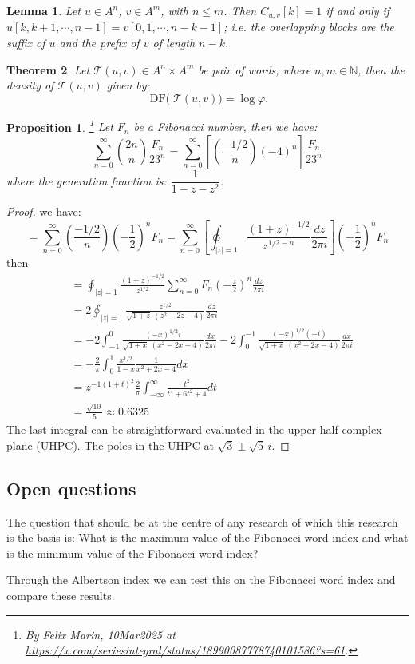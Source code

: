 \documentclass[12pt, a4paper]{article}
\newtheorem{theorem}{Theorem}[section]
\newtheorem{lemma}[theorem]{Lemma}
\newtheorem{proposition}{Proposition}[section]
\begin{document}
\begin{lemma}\cite{Rampersad2023Wiebe}
Let $u\in A^n$, $v\in A^m$, with $n\leq m$. Then $C_{u,v}[k]=1$ if and only if $u[k,k+1,\cdots,n-1] = v[0,1,\cdots,n-k-1]$; i.e. the overlapping blocks are the suffix of $u$ and the prefix of $v$ of length $n-k$.
\end{lemma}
\begin{theorem}
Let $\mathscr{T}(u,v)\in A^n\times A^m$ be pair of words, where $n,m\in \mathbb{N}$, then the density of $\mathscr{T}(u,v)$ given by: 
\[
\operatorname{DF(}\mathscr{T}(u,v))=\log \varphi.
\]
\end{theorem}


\begin{proposition}\footnote{By Felix Marin, 10Mar2025 at \url{https://x.com/seriesintegral/status/18990087778740101586?s=61}.}
Let $F_n$ be a Fibonacci number, then we have:
\[
\sum_{n=0}^{\infty} \binom{2n}{n} \frac{F_n}{23^n} = \sum_{n=0}^{\infty} \left[ \left( \frac{-1/2}{n} \right) (-4)^n \right] \frac{F_n}{23^n}
\]
where the generation function is: $\dfrac{1}{1-z-z^2}$.
\end{proposition}
\begin{proof}
   we have: 
   \[
= \sum_{n=0}^{\infty} \left( \frac{-1/2}{n} \right) \left( -\frac{1}{2} \right)^n F_n = \sum_{n=0}^{\infty} \left[ \oint_{|z|=1} \frac{(1+z)^{-1/2}}{z^{1/2-n}} \frac{dz}{2\pi i} \right] \left( -\frac{1}{2} \right)^n F_n
\]
then
\begin{align*}
&= \oint_{|z|=1} \frac{(1+z)^{-1/2}}{z^{1/2}} \sum_{n=0}^{\infty} F_n \left( -\frac{z}{2} \right)^n \frac{dz}{2\pi i} \\
&= 2 \oint_{|z|=1} \frac{z^{1/2}}{\sqrt{1+z} \ (z^2 - 2z - 4)} \frac{dz}{2\pi i} \\
&= -2 \int_{-1}^{0} \frac{(-x)^{1/2} i}{\sqrt{1+x} \ (x^2 - 2x - 4)} \frac{dx}{2\pi i} - 2 \int_{0}^{-1} \frac{(-x)^{1/2} (-i)}{\sqrt{1+x} \ (x^2 - 2x - 4)} \frac{dx}{2\pi i} \\
&= -\frac{2}{\pi} \int_{0}^{1} \frac{x^{1/2}}{1-x} \frac{1}{x^2 + 2x - 4} dx \\
&= z^{-1(1+t)^2} \frac{2}{\pi} \int_{-\infty}^{\infty} \frac{t^2}{t^4 + 6t^2 + 4} dt \\
&= \frac{\sqrt{10}}{5} \approx 0.6325
\end{align*}
The last integral can be straightforward evaluated in the upper half complex plane (UHPC). The poles in the UHPC at  $\sqrt{3} \pm \sqrt{5} \, i$.
\end{proof}
\subsection{Open questions}
The question that should be at the centre of any research of which this research is the basis is: What is the maximum value of the Fibonacci word index and what is the minimum value of the Fibonacci word index?\par 
Through the Albertson index we can test this on the Fibonacci word index and compare these results.
\end{document}
